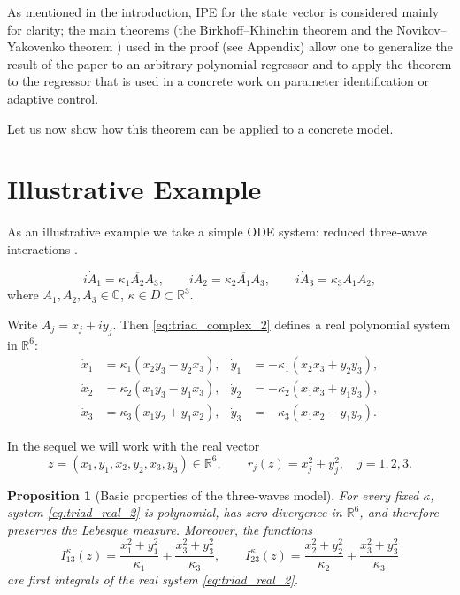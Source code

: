 \documentclass[11pt]{article}
\newcommand{\R}{\mathbb{R}}
\newcommand{\CC}{\mathbb{C}}
\theoremstyle{thmstyleone}
\newtheorem{proposition}[theorem]{Proposition}
\theoremstyle{thmstyletwo}
\theoremstyle{thmstylethree}
\begin{document}
As mentioned in the introduction, IPE for the state vector is considered mainly for clarity; the main theorems (the Birkhoff–Khinchin theorem \cite{Birkhoff1931,CornfeldFominSinai1982} and the Novikov–Yakovenko theorem \cite{NovikovYakovenko1999}) used in the proof (see Appendix) allow one to generalize the result of the paper to an arbitrary polynomial regressor and to apply the theorem to the regressor that is used in a concrete work on parameter identification or adaptive control.



Let us now show how this theorem can be applied to a concrete model.



\section{Illustrative Example}
\label{sec:triad_model_2}

As an illustrative example we take a simple ODE system: reduced three‑wave interactions \cite{kaup1979space}.


\begin{equation}\label{eq:triad_complex_2}
    i\dot A_1=\kappa_1\overline{A_2}A_3,
    \qquad
    i\dot A_2=\kappa_2\overline{A_1}A_3,
    \qquad
    i\dot A_3=\kappa_3A_1A_2,
\end{equation}
where $A_1,A_2,A_3\in\CC$, $\kappa\in D \subset \R^3$.

Write $A_j=x_j+iy_j$. Then \eqref{eq:triad_complex_2} defines a real polynomial system in $\R^6$:
\begin{equation}\label{eq:triad_real_2}
\begin{aligned}
\dot x_1&=\kappa_1(x_2y_3-y_2x_3),&
\dot y_1&=-\kappa_1(x_2x_3+y_2y_3),\\
\dot x_2&=\kappa_2(x_1y_3-y_1x_3),&
\dot y_2&=-\kappa_2(x_1x_3+y_1y_3),\\
\dot x_3&=\kappa_3(x_1y_2+y_1x_2),&
\dot y_3&=-\kappa_3(x_1x_2-y_1y_2).
\end{aligned}
\end{equation}

In the sequel we will work with the real vector
\[
    z=(x_1,y_1,x_2,y_2,x_3,y_3)\in\R^6,
    \qquad
    r_j(z)=x_j^2+y_j^2,
    \quad j=1,2,3.
\]

\begin{proposition}[Basic properties of the three-waves model]
\label{prop:triad_basic_2}
For every fixed $\kappa$, system \eqref{eq:triad_real_2} is polynomial, has zero divergence in $\R^6$, and therefore preserves the Lebesgue measure. Moreover, the functions
\begin{equation}\label{eq:triad_MR_2}
    I_{13}^{\kappa}(z)=\frac{x_1^2+y_1^2}{\kappa_1}+\frac{x_3^2+y_3^2}{\kappa_3},
    \qquad
    I_{23}^{\kappa}(z)=\frac{x_2^2+y_2^2}{\kappa_2}+\frac{x_3^2+y_3^2}{\kappa_3}
\end{equation}
are first integrals of the real system \eqref{eq:triad_real_2}.
\end{proposition}
\end{document}

